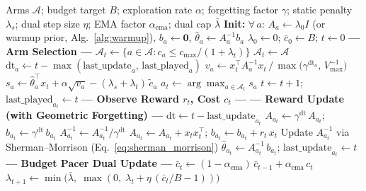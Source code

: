 \begin{algorithm}[t]
\caption{ParetoBandit: Budget-Paced Non-Stationary Routing}
\label{alg:paretobandit}
\begin{algorithmic}[1]
\Require Arms $\mathcal{A}$; budget target $B$; exploration rate $\alpha$; forgetting factor $\gamma$; static penalty $\lambda_s$; dual step size $\eta$; EMA factor $\alpha_{\mathrm{ema}}$; dual cap $\bar\lambda$
\Statex \textbf{Init:} $\forall\, a$: $A_a \!\leftarrow\! \lambda_0 I$ (or warmup prior, Alg.~\ref{alg:warmup}), $b_a \!\leftarrow\! \mathbf{0}$, $\hat\theta_a \!\leftarrow\! A_a^{-1} b_a$
\Statex {} $\lambda_0 \leftarrow 0$;\; $\bar{c}_0 \leftarrow B$;\; $t \leftarrow 0$
    \State \textbf{--- Arm Selection ---}
     
        \State $\mathcal{A}_t \leftarrow \bigl\{a \in \mathcal{A} : c_a \leq c_{\max} / (1 + \lambda_t)\bigr\}$ \label{line:ceiling}
    \Else\; $\mathcal{A}_t \leftarrow \mathcal{A}$
    \EndIf
        \State $\mathrm{dt}_a \leftarrow t - \max(\text{last\_update}_a,\, \text{last\_played}_a)$
        \State $v_a \leftarrow x_t^\top A_a^{-1} x_t \,\big/\, \max\!\bigl(\gamma^{\mathrm{dt}_a},\, V_{\max}^{-1}\bigr)$ 
        \State $s_a \leftarrow \hat\theta_a^\top x_t + \alpha\sqrt{v_a} - (\lambda_s + \lambda_t)\,\tilde{c}_a$ \label{line:ucb}
    \EndFor
    \State $a_t \leftarrow \arg\max_{a \in \mathcal{A}_t} s_a$ 
    \State $t \leftarrow t + 1$;\; $\text{last\_played}_{a_t} \leftarrow t$
    \Statex
    \State \textbf{--- Observe Reward $r_t$, Cost $c_t$ ---}
    \Statex
    \State \textbf{--- Reward Update (with Geometric Forgetting) ---}
    \State $\mathrm{dt} \leftarrow t - \text{last\_update}_{a_t}$
    \State $A_{a_t} \leftarrow \gamma^{\mathrm{dt}}\, A_{a_t}$;\;\; $b_{a_t} \leftarrow \gamma^{\mathrm{dt}}\, b_{a_t}$ \label{line:forget}
    \State $A_{a_t}^{-1} \leftarrow A_{a_t}^{-1} / \gamma^{\mathrm{dt}}$ 
    \State $A_{a_t} \leftarrow A_{a_t} + x_t x_t^\top$;\;\; $b_{a_t} \leftarrow b_{a_t} + r_t\, x_t$
    \State Update $A_{a_t}^{-1}$ via Sherman--Morrison (Eq.~\ref{eq:sherman_morrison}) 
    \State $\hat\theta_{a_t} \leftarrow A_{a_t}^{-1}\, b_{a_t}$;\;\; $\text{last\_update}_{a_t} \leftarrow t$
    \Statex
    \State \textbf{--- Budget Pacer Dual Update ---}
    \State $\bar{c}_t \leftarrow (1 - \alpha_{\mathrm{ema}})\,\bar{c}_{t-1} + \alpha_{\mathrm{ema}}\,c_t$ 
    \State $\lambda_{t+1} \leftarrow \min\!\bigl(\bar\lambda,\; \max(0,\; \lambda_t + \eta\,(\bar{c}_t / B - 1))\bigr)$ \label{line:dual} 
\EndFor
\end{algorithmic}
\end{algorithm}
